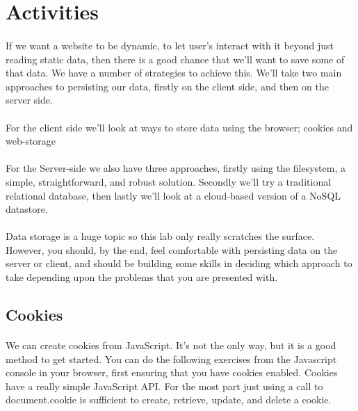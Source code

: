\documentclass[10pt, a4paper, twosize]{article}
\begin{document}


\section{Activities}

\paragraph{} If we want a website to be dynamic, to let user's interact with it beyond just reading static data, then there is a good chance that we'll want to save some of that data. We have a number of strategies to achieve this. We'll take two main approaches to persisting our data, firstly on the client side, and then on the server side. 

\paragraph{} For the client side we'll look at ways to store data using the browser; cookies and web-storage%

\paragraph{} For the Server-side we also have three approaches, firstly using the filesystem, a simple, straightforward, and robust solution. Secondly we'll try a traditional relational database, then lastly we'll look at a cloud-based version of a NoSQL datastore.

\paragraph{} Data storage is a huge topic so this lab only really scratches the surface. However, you should, by the end, feel comfortable with persisting data on the server or client, and should be building some skills in deciding which approach to take depending upon the problems that you are presented with.

\subsection{Cookies}
\paragraph{} We can create cookies from JavaScript. It's not the only way, but it is a good method to get started. You can do the following exercises from the Javascript console in your browser, first ensuring that you have cookies enabled. Cookies have a really simple JavaScript API. For the most part just using a call to document.cookie is sufficient to create, retrieve, update, and delete a cookie.
\end{document}
